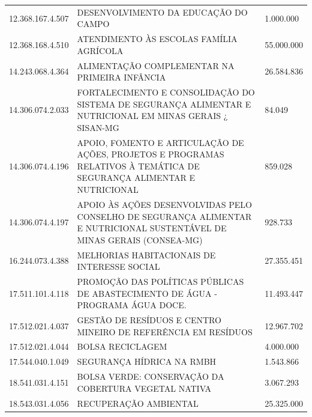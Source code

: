 \documentclass{article}
\begin{document}
\begin{longtable}[c]{m{3cm}|m{12cm}|m{2cm}}
\multicolumn{1}{C{3cm}|}{12.368.167.4.507} & \multicolumn{1}{L{12cm}|}{DESENVOLVIMENTO DA EDUCAÇÃO DO CAMPO} & \multicolumn{1}{R{2cm}}{1.000.000} \\
\multicolumn{1}{C{3cm}|}{12.368.168.4.510} & \multicolumn{1}{L{12cm}|}{ATENDIMENTO ÀS ESCOLAS FAMÍLIA AGRÍCOLA} & \multicolumn{1}{R{2cm}}{55.000.000} \\
\multicolumn{1}{C{3cm}|}{14.243.068.4.364} & \multicolumn{1}{L{12cm}|}{ALIMENTAÇÃO COMPLEMENTAR NA PRIMEIRA INFÂNCIA} & \multicolumn{1}{R{2cm}}{26.584.836} \\
\multicolumn{1}{C{3cm}|}{14.306.074.2.033} & \multicolumn{1}{L{12cm}|}{FORTALECIMENTO E CONSOLIDAÇÃO DO SISTEMA DE SEGURANÇA ALIMENTAR E NUTRICIONAL EM MINAS GERAIS ¿ SISAN-MG} & \multicolumn{1}{R{2cm}}{84.049} \\
\multicolumn{1}{C{3cm}|}{14.306.074.4.196} & \multicolumn{1}{L{12cm}|}{APOIO, FOMENTO E ARTICULAÇÃO DE AÇÕES, PROJETOS E PROGRAMAS RELATIVOS À TEMÁTICA DE SEGURANÇA ALIMENTAR E NUTRICIONAL} & \multicolumn{1}{R{2cm}}{859.028} \\
\multicolumn{1}{C{3cm}|}{14.306.074.4.197} & \multicolumn{1}{L{12cm}|}{APOIO ÀS AÇÕES DESENVOLVIDAS PELO CONSELHO DE SEGURANÇA ALIMENTAR E NUTRICIONAL SUSTENTÁVEL DE MINAS GERAIS (CONSEA-MG)} & \multicolumn{1}{R{2cm}}{928.733} \\
\multicolumn{1}{C{3cm}|}{16.244.073.4.388} & \multicolumn{1}{L{12cm}|}{MELHORIAS HABITACIONAIS DE INTERESSE SOCIAL} & \multicolumn{1}{R{2cm}}{27.355.451} \\
\multicolumn{1}{C{3cm}|}{17.511.101.4.118} & \multicolumn{1}{L{12cm}|}{PROMOÇÃO DAS POLÍTICAS PÚBLICAS DE ABASTECIMENTO DE ÁGUA - PROGRAMA ÁGUA DOCE.} & \multicolumn{1}{R{2cm}}{11.493.447} \\
\multicolumn{1}{C{3cm}|}{17.512.021.4.037} & \multicolumn{1}{L{12cm}|}{GESTÃO DE RESÍDUOS E CENTRO MINEIRO DE REFERÊNCIA EM RESÍDUOS} & \multicolumn{1}{R{2cm}}{12.967.702} \\
\multicolumn{1}{C{3cm}|}{17.512.021.4.044} & \multicolumn{1}{L{12cm}|}{BOLSA RECICLAGEM} & \multicolumn{1}{R{2cm}}{4.000.000} \\
\multicolumn{1}{C{3cm}|}{17.544.040.1.049} & \multicolumn{1}{L{12cm}|}{SEGURANÇA HÍDRICA NA RMBH} & \multicolumn{1}{R{2cm}}{1.543.866} \\
\multicolumn{1}{C{3cm}|}{18.541.031.4.151} & \multicolumn{1}{L{12cm}|}{BOLSA VERDE: CONSERVAÇÃO DA COBERTURA VEGETAL NATIVA} & \multicolumn{1}{R{2cm}}{3.067.293} \\
\multicolumn{1}{C{3cm}|}{18.543.031.4.056} & \multicolumn{1}{L{12cm}|}{RECUPERAÇÃO AMBIENTAL} & \multicolumn{1}{R{2cm}}{25.325.000} \\

\end{longtable}
\end{document}
